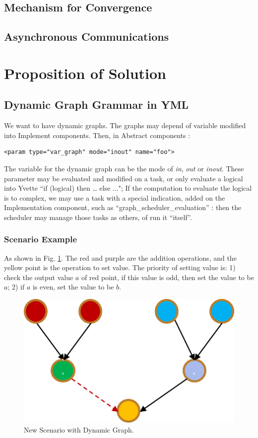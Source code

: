\subsection{Mechanism for Convergence}
\subsection{Asynchronous Communications}
\section{Proposition of Solution}

\subsection{Dynamic Graph Grammar in YML}

We want to have dynamic graphs. The graphs may depend of variable  modified into Implement components. Then, in Abstract components :

\lstset{language=XML}
\begin{lstlisting}[frame=single]
<param type="var_graph" mode="inout" name="foo">
\end{lstlisting}

The variable for the dynamic graph can be the mode of \textit{in}, \textit{out} or \textit{inout}. These parameter may be evaluated and modified on a task, or  only evaluate a logical  into Yvette “if (logical) then … else ..."; If the computation to evaluate the logical is to complex, we may use a task with a special indication, added on the Implementation component, such as “graph\_scheduler\_evaluation”  : then the scheduler may manage those tasks as others, of run it “itself”.

\subsubsection{Scenario Example}

As shown in Fig. \ref{fig:sum_workflow2}. The red and purple are the addition operations, and the yellow point is the operation to set value. The priority of setting value is: 1) check the output value $a$ of red point, if this value is odd, then set the value to be $a$; 2) if $a$ is even, set the value to be $b$.

\begin{figure}[htbp]
	\centering
	\includegraphics[width=3.in]{fig/sum_workflow2.pdf}
	\caption{New Scenario with Dynamic Graph.}
	\label{fig:sum_workflow2}
\end{figure}

